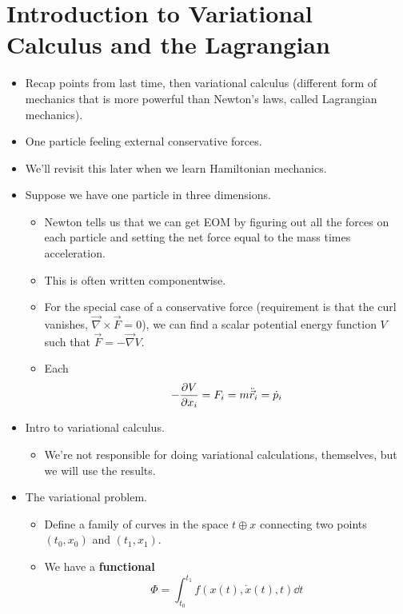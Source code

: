 \documentclass[../notes.tex]{subfiles}
\begin{document}
\section{Introduction to Variational Calculus and the Lagrangian}
\begin{itemize}
    \item {}Recap points from last time, then variational calculus (different form of mechanics that is more powerful than Newton's laws, called Lagrangian mechanics).
    \item One particle feeling external conservative forces.
    \item We'll revisit this later when we learn Hamiltonian mechanics.
    \item Suppose we have one particle in three dimensions.
    \begin{itemize}
        \item Newton tells us that we can get EOM by figuring out all the forces on each particle and setting the net force equal to the mass times acceleration.
        \item This is often written componentwise.
        \item For the special case of a conservative force (requirement is that the curl vanishes, $\vec{\nabla}\times\vec{F}=0$), we can find a scalar potential energy function $V$ such that $\vec{F}=-\vec{\nabla}V$.
        \item Each
        \begin{equation*}
            -\pdv{V}{x_i} = F_i = m\ddot{\vec{r}}_i = \dot{p}_i
        \end{equation*}
    \end{itemize}
    \item Intro to variational calculus.
    \begin{itemize}
        \item We're not responsible for doing variational calculations, themselves, but we will use the results.
    \end{itemize}
    \item The variational problem.
    \begin{itemize}
        \item Define a family of curves in the space $t\oplus x$ connecting two points $(t_0,x_0)$ and $(t_1,x_1)$.
        \item We have a \textbf{functional}
        \begin{equation*}
            \Phi = \int_{t_0}^{t_1}f(x(t),\dot{x}(t),t)\dd{t}
        \end{equation*}

\end{itemize}
\end{itemize}
\end{document}
